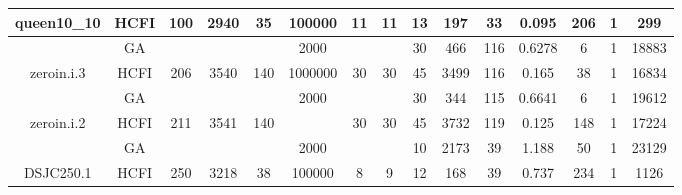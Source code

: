 \documentclass[10pt]{article}
\begin{document}
\begin{center}
\begin{table}[H]
\begin{tabular}{|c|c|c|c|c|c|c|c|c|c|c|c|c|c|c|}
 \multirow{-2}{*}{queen10\_10} &HCFI   &\multirow{-2}{*}{100}   &\multirow{-2}{*}{2940}     &\multirow{-2}{*}{35}     &100000     &\multirow{-2}{*}{\cellcolor{yellow}11}      & \multirow{-2}{*}{\cellcolor{yellow}11}    &{\cellcolor{green}13}     &197         &33    &0.095         &206    &1     &299       \\ \hline \hline
	&GA&       &                   &                     &     2000   &     \cellcolor{yellow} & {\cellcolor{yellow}}& {{\cellcolor{green}30}}
&466   &116        &  0.6278                  &6                    &1          & 18883       \\ \cline{2-2} \cline{6-6} \cline{9-15}
 \multirow{-2}{*}{zeroin.i.3} &HCFI   &\multirow{-2}{*}{206}   &\multirow{-2}{*}{3540}     &\multirow{-2}{*}{140}     &1000000     &\multirow{-2}{*}{\cellcolor{yellow}30}      & \multirow{-2}{*}{\cellcolor{yellow}30}    &{\cellcolor{green}45}     &3499         &116    &0.165         &38    &1     &16834         \\ \hline \hline
	&GA&       &                   &                     &     2000    &     \cellcolor{yellow} & {\cellcolor{yellow}}& {{\cellcolor{green}30}}
&344   &115        & 0.6641                   &6                    & 1         &19612        \\ \cline{2-2} \cline{6-6} \cline{9-15}
 \multirow{-2}{*}{zeroin.i.2} &HCFI   &\multirow{-2}{*}{211}   &\multirow{-2}{*}{3541}     &\multirow{-2}{*}{140}     &     &\multirow{-2}{*}{\cellcolor{yellow}30}      & \multirow{-2}{*}{\cellcolor{yellow}30}    &{\cellcolor{green}45}     &3732         &119    &0.125         &148    &1     &17224        \\ \hline \hline
	&GA&       &                   &                     &    2000     &     \cellcolor{yellow} & {\cellcolor{yellow}}& {{\cellcolor{green}10}}
&2173   &39        &1.188                   &50                    &1          &23129        \\ \cline{2-2} \cline{6-6} \cline{9-15}
 \multirow{-2}{*}{DSJC250.1} &HCFI   &\multirow{-2}{*}{250}   &\multirow{-2}{*}{3218}     &\multirow{-2}{*}{38}     &100000     &\multirow{-2}{*}{\cellcolor{yellow}8}      & \multirow{-2}{*}{\cellcolor{yellow}9}    &{\cellcolor{green}12}     &168         &39    &0.737         &234    &1     &1126        \\ \hline \hline

\end{tabular}
\end{table}
\end{center}
\end{document}
